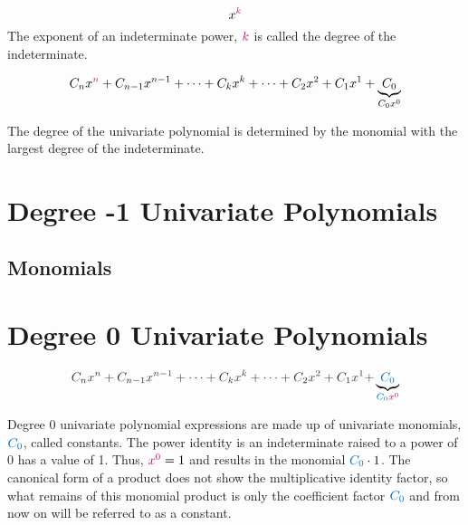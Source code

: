 \begin{definition}

\[
x^{\cRed{k}}
\]
The exponent of an indeterminate power, $\cRed{k}$ is called the degree of the indeterminate.  

\hfill \cite{wikipedia:polynomial}
\end{definition}

\begin{definition}

\[
C_{n}x^{\cRed{n}}+C_{n-1}x^{n-1}+ \cdots + C_{k}x^{k} + \cdots + C_{2}x^{2}+C_{1}x^{1}+\underbrace{C_{0}}_{C_{0}x^{0}} 
\]

The degree of the univariate polynomial is determined by the monomial with the largest degree of the indeterminate.
 
\end{definition}

\section{Degree -1 Univariate Polynomials}

\subsection*{Monomials}

\section{Degree 0 Univariate Polynomials}


\[
\cDarkGrey{C_{n}x^{n}+C_{n-1}x^{n-1}+ \cdots + C_{k}x^{k} + \cdots + C_{2}x^{2}+C_{1}x^{1}+}\underbrace{\cBlue{C_{0}}}_{\cBlue{C_{0}}\cRed{x^{0}}} 
\]

Degree 0 univariate polynomial expressions are made up of univariate monomials, $\cBlue{C_{0}}$, called \alert{constants}.  The power identity is an indeterminate raised to a power of 0 has a value of 1.  Thus, $\cRed{x^{0}}=1$ and results in the monomial $\cBlue{C_{0}} \cdot 1$.  The canonical form of a product does not show the multiplicative identity factor, so what remains of this monomial product is only the coefficient factor $\cBlue{C_{0}}$ and from now on will be referred to as a \alert{constant}.  

